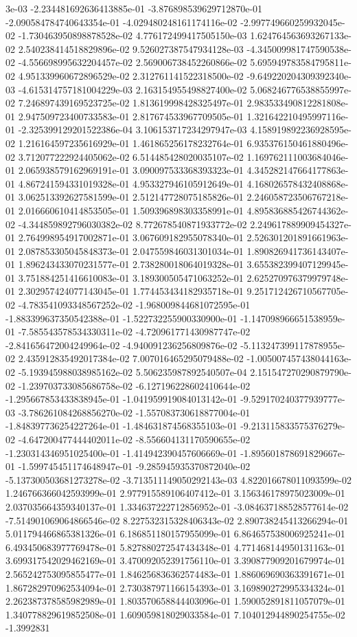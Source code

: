 3e-03	-2.234481692636413885e-01	-3.876898539629712870e-01	-2.090584784740643354e-01	-4.029480248161174116e-02	-2.997749660259932045e-02	-1.730463950898878528e-02	4.776172499417505150e-03	1.624764563693267133e-02	2.540238414518829896e-02	9.526027387547934128e-03	-4.345009981747590538e-02	-4.556698995632204457e-02	2.569006738452260866e-02	5.695949783584795811e-02	4.951339960672896529e-02	2.312761141522318500e-02	-9.649220204309392340e-03	-4.615314757181004229e-03	2.163154955498827400e-02	5.068246776538855997e-02	7.246897439169523725e-02	1.813619998428325497e-01	2.983533490812281808e-01	2.947509723400733583e-01	2.817674533967709505e-01	1.321642210495997116e-01	-2.325399129201522386e-04	3.106153717234297947e-03	4.158919892236928595e-02	1.216164597235616929e-01	1.461865256178232764e-01	6.935376150461880496e-02	3.712077222924405062e-02	6.514485428020035107e-02	1.169762111003684046e-01	2.065938579162969191e-01	3.090097533368393323e-01	4.345282147664177863e-01	4.867241594331019328e-01	4.953327946105912649e-01	4.168026578432408868e-01	3.062513392627581599e-01	2.512147728075185826e-01	2.246058723506767218e-01	2.016660610414853505e-01	1.509396898303358991e-01	4.895836885426744362e-02	-4.344859892796030382e-02	8.772678540871933772e-02	2.249617889909454327e-01	2.764998954917002871e-01	3.067609182955078340e-01	2.526301201891661963e-01	2.087853305045848373e-01	2.047559846031301034e-01	1.890826941736143407e-01	1.896243433070231577e-01	2.738280018064019328e-01	3.655382399407129945e-01	3.751884251416610083e-01	3.189300505471063252e-01	2.625270976379979748e-01	2.302957424077143045e-01	1.774453434182935718e-01	9.251712426710567705e-02	-4.783541093348567252e-02	-1.968009844681072595e-01	-1.883399637350542388e-01	-1.522732255900330900e-01	-1.147098966651538959e-01	-7.585543578534330311e-02	-4.720961771430987747e-02	-2.841656472004249964e-02	-4.940091236256809876e-02	-5.113247399117878955e-02	2.435912835492017384e-02	7.007016465295079488e-02	-1.005007457438044163e-02	-5.193945988038985162e-02	5.506235987892540507e-04	2.151547270290879790e-02	-1.239703733085686758e-02	-6.127196228602410644e-02	-1.295667853433838945e-01	-1.041959919084013142e-01	-9.529170240377939777e-03	-3.786261084268856270e-02	-1.557083730618877004e-01	-1.848397736254227264e-01	-1.484631874568355103e-01	-9.213115833575376279e-02	-4.647200477444402011e-02	-8.556604131170590655e-02	-1.230314346951025400e-01	-1.414942390457606669e-01	-1.895601878691829667e-01	-1.599745451174648947e-01	-9.285945935370872040e-02	-5.137300503681273278e-02	-3.713511149050292143e-03	4.822016678011093599e-02	1.246766366042593999e-01	2.977915589106407412e-01	3.156346178975023009e-01	2.037035664359340137e-01	1.334637222712856952e-01	-3.084637188528577614e-02	-7.514901069064866546e-02	8.227532315328406343e-02	2.890738245413266294e-01	5.011794466865381326e-01	6.186851180157955099e-01	6.864657538006925241e-01	6.493450683977769478e-01	5.827880272547434348e-01	4.771468144950131163e-01	3.699317542029462169e-01	3.470092052391756110e-01	3.390877909201679974e-01	2.565242753095855477e-01	1.846256836362574483e-01	1.886069690363391671e-01	1.867282970962534094e-01	2.730387971166154393e-01	3.169890272995334324e-01	2.262387378585982989e-01	1.803570658844403096e-01	1.590052891811057079e-01	1.340778829619852508e-01	1.609059818029033584e-01	7.104012944890254755e-02	-1.3992831